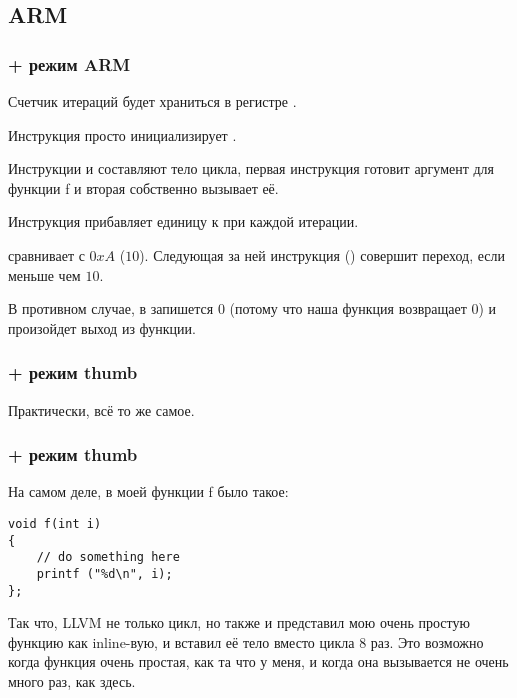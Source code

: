 ﻿\subsection{ARM}

\subsubsection{\NonOptimizingKeil + режим ARM}



Счетчик итераций  будет храниться в регистре .

Инструкция  просто инициализирует .

Инструкции  и  составляют тело цикла, первая инструкция готовит аргумент для
функции f и вторая собственно вызывает её.

Инструкция  прибавляет единицу к  при каждой итерации.

 сравнивает  с $0xA$ ($10$). Следующая за ней инструкция  
() совершит переход, если  меньше чем $10$.

В противном случае, в  запишется $0$ (потому что наша функция возвращает 0) и произойдет выход из функции.

\subsubsection{\OptimizingKeil + режим thumb}



Практически, всё то же самое.

\subsubsection{\OptimizingXcode + режим thumb}



На самом деле, в моей функции f было такое:

\begin{lstlisting}
void f(int i)
{
    // do something here
    printf ("%d\n", i);
};
\end{lstlisting}

Так что, LLVM не только  цикл, но также и представил мою очень простую функцию  как inline-вую,
и вставил её тело вместо цикла 8 раз. Это возможно когда функция очень простая, как та что у меня, и когда
она вызывается не очень много раз, как здесь.

